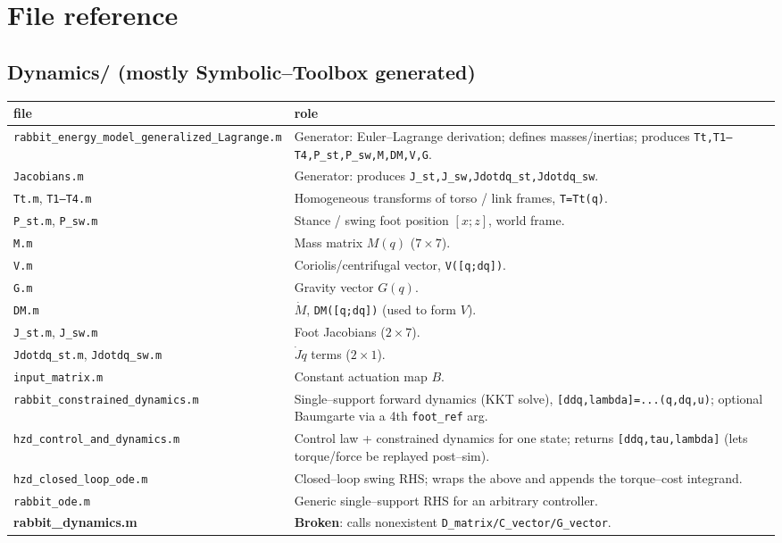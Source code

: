 \documentclass[11pt,a4paper]{article}
\newcommand{\code}[1]{\texttt{#1}}          %
\newcommand{\fname}[1]{\texttt{#1}}          %
\newcommand{\warn}[1]{\textcolor{red!70!black}{\textbf{#1}}}
\begin{document}
\section{File reference}
\renewcommand{\arraystretch}{1.15}

\subsection*{Dynamics/ (mostly Symbolic--Toolbox generated)}
\begin{longtable}{@{}L{4.7cm} L{9.5cm}@{}}
\toprule
file & role \\
\midrule
\endhead
\fname{rabbit\_energy\_model\_generalized\_Lagrange.m} & Generator: Euler--Lagrange derivation; defines masses/inertias; produces \code{Tt,T1--T4,P\_st,P\_sw,M,DM,V,G}. \\
\fname{Jacobians.m} & Generator: produces \code{J\_st,J\_sw,Jdotdq\_st,Jdotdq\_sw}. \\
\fname{Tt.m}, \fname{T1--T4.m} & Homogeneous transforms of torso / link frames, \code{T=Tt(q)}. \\
\fname{P\_st.m}, \fname{P\_sw.m} & Stance / swing foot position $[x;z]$, world frame. \\
\fname{M.m} & Mass matrix $M(q)$ ($7\times7$). \\
\fname{V.m} & Coriolis/centrifugal vector, \code{V([q;dq])}. \\
\fname{G.m} & Gravity vector $G(q)$. \\
\fname{DM.m} & $\dot M$, \code{DM([q;dq])} (used to form $V$). \\
\fname{J\_st.m}, \fname{J\_sw.m} & Foot Jacobians ($2\times7$). \\
\fname{Jdotdq\_st.m}, \fname{Jdotdq\_sw.m} & $\dot J\dot q$ terms ($2\times1$). \\
\fname{input\_matrix.m} & Constant actuation map $B$. \\
\fname{rabbit\_constrained\_dynamics.m} & Single--support forward dynamics (KKT solve), \code{[ddq,lambda]=...(q,dq,u)}; optional Baumgarte via a 4th \code{foot\_ref} arg. \\
\fname{hzd\_control\_and\_dynamics.m} & Control law + constrained dynamics for one state; returns \code{[ddq,tau,lambda]} (lets torque/force be replayed post--sim). \\
\fname{hzd\_closed\_loop\_ode.m} & Closed--loop swing RHS; wraps the above and appends the torque--cost integrand. \\
\fname{rabbit\_ode.m} & Generic single--support RHS for an arbitrary controller. \\
\warn{rabbit\_dynamics.m} & \warn{Broken}: calls nonexistent \code{D\_matrix/C\_vector/G\_vector}. \\
\bottomrule
\end{longtable}
\end{document}
